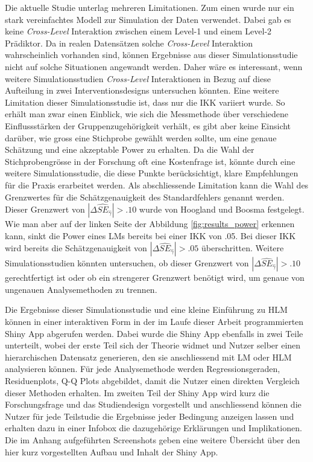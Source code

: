 \documentclass[12pt, a4paper]{article}\usepackage[]{graphicx}\usepackage[]{color}
\begin{document}
Die aktuelle Studie unterlag mehreren Limitationen. Zum einen wurde nur ein stark vereinfachtes Modell zur Simulation der Daten verwendet. Dabei gab es keine \textit{Cross-Level} Interaktion zwischen einem Level-1 und einem Level-2 Prädiktor. Da in realen Datensätzen solche \textit{Cross-Level} Interaktion wahrscheinlich vorhanden sind, können Ergebnisse aus dieser Simulationsstudie nicht auf solche Situationen angewandt werden. Daher wäre es interessant, wenn weitere Simulationsstudien \textit{Cross-Level} Interaktionen in Bezug auf diese Aufteilung in zwei Interventionsdesigns untersuchen könnten. Eine weitere Limitation dieser Simulationsstudie ist, dass nur die IKK variiert wurde. So erhält man zwar einen Einblick, wie sich die Messmethode über verschiedene Einflussstärken der Gruppenzugehörigkeit verhält, es gibt aber keine Einsicht darüber, wie gross eine Stichprobe gewählt werden sollte, um eine genaue Schätzung und eine akzeptable Power zu erhalten. Da die Wahl der Stichprobengrösse in der Forschung oft eine Kostenfrage ist, könnte durch eine weitere Simulationsstudie, die diese Punkte berücksichtigt, klare Empfehlungen für die Praxis erarbeitet werden. Als abschliessende Limitation kann die Wahl des Grenzwertes für die Schätzgenauigkeit des Standardfehlers genannt werden. Dieser Grenzwert von $|\Delta\widehat{SE}_{\widehat{\gamma}}| > .10$ wurde von Hoogland und Boosma \citeyearpar{hooglandboosma1998robustness} festgelegt. Wie man aber auf der linken Seite der Abbildung \ref{fig:results_power} erkennen kann, sinkt die Power eines LMs bereits bei einer IKK von .05. Bei dieser IKK wird bereits die Schätzgenauigkeit von $|\Delta\widehat{SE}_{\widehat{\gamma}}| > .05$ überschritten. Weitere Simulationsstudien könnten untersuchen, ob dieser Grenzwert von $|\Delta\widehat{SE}_{\widehat{\gamma}}| > .10$ gerechtfertigt ist oder ob ein strengerer Grenzwert benötigt wird, um genaue von ungenauen Analysemethoden zu trennen.

Die Ergebnisse dieser Simulationsstudie und eine kleine Einführung zu HLM können in einer interaktiven Form in der im Laufe dieser Arbeit programmierten Shiny App abgerufen werden. Dabei wurde die Shiny App ebenfalls in zwei Teile unterteilt, wobei der erste Teil sich der Theorie widmet und Nutzer selber einen hierarchischen Datensatz generieren, den sie anschliessend mit LM oder HLM analysieren können. Für jede Analysemethode werden Regressionsgeraden, Residuenplots, Q-Q Plots abgebildet, damit die Nutzer einen direkten Vergleich dieser Methoden erhalten. Im zweiten Teil der Shiny App wird kurz die Forschungsfrage und das Studiendesign vorgestellt und anschliessend können die Nutzer für jede Teilstudie die Ergebnisse jeder Bedingung anzeigen lassen und erhalten dazu in einer Infobox die dazugehörige Erklärungen und Implikationen. Die im Anhang aufgeführten Screenshots geben eine weitere Übersicht über den hier kurz vorgestellten Aufbau und Inhalt der Shiny App.
\end{document}
